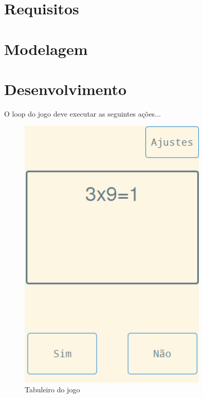 \documentclass[
12pt,
a4paper,
portuges,
draft
]{report}
\begin{document}
\section{Requisitos}
\section{Modelagem}
\section{Desenvolvimento}

O loop do jogo deve executar as seguintes ações...


\begin{figure}
    \centering
    \includegraphics[width=0.8\textwidth,natwidth=610,natheight=642]{board.png}
	\caption{Tabuleiro do jogo}
\end{figure}
\end{document}
